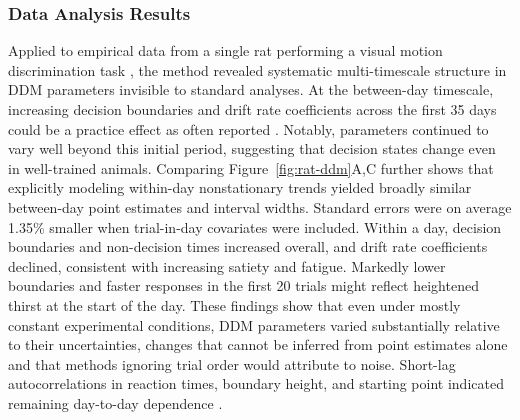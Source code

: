 \documentclass[00-main.tex]{subfiles}
\begin{document}
\subsubsection*{Data Analysis Results}
Applied to empirical data from a single rat performing a visual motion discrimination task \citep{reinagel_speed_2013}, the method revealed systematic multi-timescale structure in DDM parameters invisible to standard analyses. At the between-day timescale, increasing decision boundaries and drift rate coefficients across the first 35 days could be a practice effect as often reported \citep{ashwood_mice_2022, mohammadi_identifying_2025, cochrane_multiple_2023, alister_diffusion_2026}. Notably, parameters continued to vary well beyond this initial period, suggesting that decision states change even in well-trained animals. Comparing Figure~\ref{fig:rat-ddm}A,C further shows that explicitly modeling within-day nonstationary trends yielded broadly similar between-day point estimates and interval widths. Standard errors were on average 1.35\% smaller when trial-in-day covariates were included. Within a day, decision boundaries and non-decision times increased overall, and drift rate coefficients declined, consistent with increasing satiety and fatigue. Markedly lower boundaries and faster responses in the first 20 trials might reflect heightened thirst at the start of the day. These findings show that even under mostly constant experimental conditions, DDM parameters varied substantially relative to their uncertainties, changes that cannot be inferred from point estimates alone and that methods ignoring trial order would attribute to noise. Short-lag autocorrelations in reaction times, boundary height, and starting point indicated remaining day-to-day dependence \citep{urai_choice_2019, busse_detection_2011, danskin_exponential_2023, frund_quantifying_2014, gao_sequential_2009}.
\end{document}
